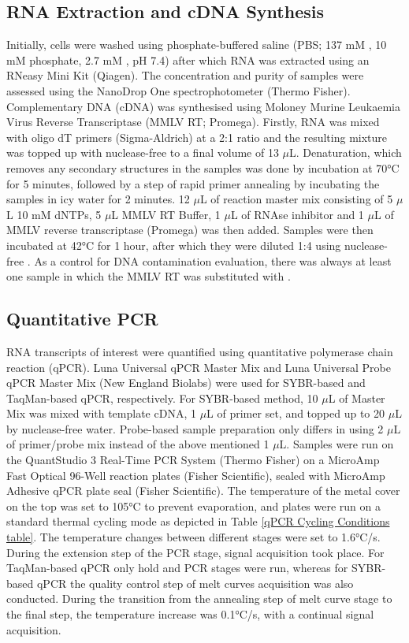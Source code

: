 \subsection{RNA Extraction and cDNA Synthesis} \label{RNA Extraction and cDNA Synthesis}
Initially, cells were washed using phosphate-buffered saline (PBS; 137 mM , 10 mM phosphate, 2.7 mM , pH 7.4) after which RNA was extracted using an RNeasy Mini Kit (Qiagen). The concentration and purity of samples were assessed using the NanoDrop One spectrophotometer (Thermo Fisher). Complementary DNA (cDNA) was synthesised using Moloney Murine Leukaemia Virus Reverse Transcriptase (MMLV RT; Promega). Firstly, RNA was mixed with oligo dT primers (Sigma-Aldrich) at a 2:1 ratio and the resulting mixture was topped up with nuclease-free  to a final volume of 13 \(\mu\)L. Denaturation, which removes any secondary structures in the samples was done by incubation at 70°C for 5 minutes, followed by a step of rapid primer annealing by incubating the samples in icy water for 2 minutes. 12 \(\mu\)L of reaction master mix consisting of 5 \(\mu\)L 10 mM dNTPs, 5 \(\mu\)L MMLV RT Buffer, 1 \(\mu\)L of RNAse inhibitor and 1 \(\mu\)L of MMLV reverse transcriptase (Promega) was then added. Samples were then incubated at 42°C for 1 hour, after which they were diluted 1:4 using nuclease-free . As a control for DNA contamination evaluation, there was always at least one sample in which the MMLV RT was substituted with .




\subsection{Quantitative PCR} \label{Quantitative PCR}
RNA transcripts of interest were quantified using quantitative polymerase chain reaction (qPCR). Luna Universal qPCR Master Mix and Luna Universal Probe qPCR Master Mix (New England Biolabs) were used for SYBR-based and TaqMan-based qPCR, respectively. For SYBR-based method, 10 \(\mu\)L of Master Mix was mixed with template cDNA, 1 \(\mu\)L of primer set, and topped up to 20 \(\mu\)L by nuclease-free water. Probe-based sample preparation only differs in using 2 \(\mu\)L of primer/probe mix instead of the above mentioned 1 \(\mu\)L. Samples were run on the QuantStudio 3 Real-Time PCR System (Thermo Fisher) on a MicroAmp Fast Optical 96-Well reaction plates (Fisher Scientific), sealed with MicroAmp Adhesive qPCR plate seal (Fisher Scientific). The temperature of the metal cover on the top was set to 105°C to prevent evaporation, and plates were run on a standard thermal cycling mode as depicted in Table \ref{qPCR Cycling Conditions table}. The temperature changes between different stages were set to 1.6°C/s. During the extension step of the PCR stage, signal acquisition took place. For TaqMan-based qPCR only hold and PCR stages were run, whereas for SYBR-based qPCR the quality control step of melt curves acquisition was also conducted. During the transition from the annealing step of melt curve stage to the final step, the temperature increase was 0.1°C/s, with a continual signal acquisition.

